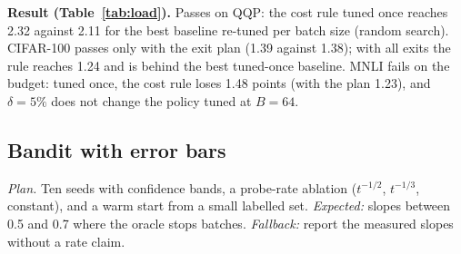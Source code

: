 \textbf{Result (Table~\ref{tab:load}).} Passes on QQP: the cost rule tuned once reaches 2.32\x{} against 2.11\x{} for
the best baseline re-tuned per batch size (random search). CIFAR-100 passes only with the exit plan (1.39\x{} against
1.38\x); with all exits the rule reaches 1.24\x{} and is behind the best tuned-once baseline. MNLI fails on the
budget: tuned once, the cost rule loses 1.48 points (with the plan 1.23), and $\delta=5\%$ does not change the policy
tuned at $B=64$.

\begin{table}[ht]
  \centering\footnotesize\setlength{\tabcolsep}{3pt}
  \caption{Fluctuating load: 3 arrival traces of 3{,}000 batches with $B$ from 1 to 128, throughput speedup over all
  batches and accuracy drop over all served inputs (held-out, cost-table replay). Criterion: tuned once, within
  budget, within 5\% of the best per-batch-size re-tuned baseline and ahead of every tuned-once baseline.
  $^{*}$ over the one-point budget. File: .}
  \label{tab:load}
\end{table}

\subsection{Bandit with error bars}\label{sec:bandit10}
\textit{Plan.} Ten seeds with confidence bands, a probe-rate ablation ($t^{-1/2}$, $t^{-1/3}$, constant), and a
warm start from a small labelled set. \textit{Expected:} slopes between 0.5 and 0.7 where the oracle stops batches.
\textit{Fallback:} report the measured slopes without a rate claim.

